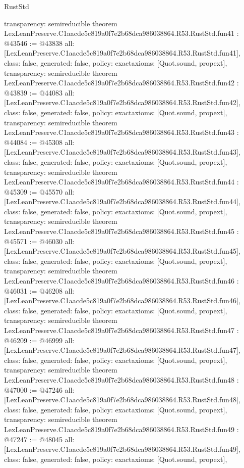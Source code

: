 \begin{lexlean}{RustStd}
\begin{coremodule}
{  transparency: semireducible
}
theorem LexLeanPreserve.C1aacde5c819a0f7e2b68dca986038864.R53.RustStd.fun41 : @43546 := @43838 {
  all: [LexLeanPreserve.C1aacde5c819a0f7e2b68dca986038864.R53.RustStd.fun41],
  class: false,
  generated: false,
  policy: exact{axioms: [Quot.sound, propext]},
  transparency: semireducible
}
theorem LexLeanPreserve.C1aacde5c819a0f7e2b68dca986038864.R53.RustStd.fun42 : @43839 := @44083 {
  all: [LexLeanPreserve.C1aacde5c819a0f7e2b68dca986038864.R53.RustStd.fun42],
  class: false,
  generated: false,
  policy: exact{axioms: [Quot.sound, propext]},
  transparency: semireducible
}
theorem LexLeanPreserve.C1aacde5c819a0f7e2b68dca986038864.R53.RustStd.fun43 : @44084 := @45308 {
  all: [LexLeanPreserve.C1aacde5c819a0f7e2b68dca986038864.R53.RustStd.fun43],
  class: false,
  generated: false,
  policy: exact{axioms: [Quot.sound, propext]},
  transparency: semireducible
}
theorem LexLeanPreserve.C1aacde5c819a0f7e2b68dca986038864.R53.RustStd.fun44 : @45309 := @45570 {
  all: [LexLeanPreserve.C1aacde5c819a0f7e2b68dca986038864.R53.RustStd.fun44],
  class: false,
  generated: false,
  policy: exact{axioms: [Quot.sound, propext]},
  transparency: semireducible
}
theorem LexLeanPreserve.C1aacde5c819a0f7e2b68dca986038864.R53.RustStd.fun45 : @45571 := @46030 {
  all: [LexLeanPreserve.C1aacde5c819a0f7e2b68dca986038864.R53.RustStd.fun45],
  class: false,
  generated: false,
  policy: exact{axioms: [Quot.sound, propext]},
  transparency: semireducible
}
theorem LexLeanPreserve.C1aacde5c819a0f7e2b68dca986038864.R53.RustStd.fun46 : @46031 := @46208 {
  all: [LexLeanPreserve.C1aacde5c819a0f7e2b68dca986038864.R53.RustStd.fun46],
  class: false,
  generated: false,
  policy: exact{axioms: [Quot.sound, propext]},
  transparency: semireducible
}
theorem LexLeanPreserve.C1aacde5c819a0f7e2b68dca986038864.R53.RustStd.fun47 : @46209 := @46999 {
  all: [LexLeanPreserve.C1aacde5c819a0f7e2b68dca986038864.R53.RustStd.fun47],
  class: false,
  generated: false,
  policy: exact{axioms: [Quot.sound, propext]},
  transparency: semireducible
}
theorem LexLeanPreserve.C1aacde5c819a0f7e2b68dca986038864.R53.RustStd.fun48 : @47000 := @47246 {
  all: [LexLeanPreserve.C1aacde5c819a0f7e2b68dca986038864.R53.RustStd.fun48],
  class: false,
  generated: false,
  policy: exact{axioms: [Quot.sound, propext]},
  transparency: semireducible
}
theorem LexLeanPreserve.C1aacde5c819a0f7e2b68dca986038864.R53.RustStd.fun49 : @47247 := @48045 {
  all: [LexLeanPreserve.C1aacde5c819a0f7e2b68dca986038864.R53.RustStd.fun49],
  class: false,
  generated: false,
  policy: exact{axioms: [Quot.sound, propext]},
}
\end{coremodule}
\end{lexlean}

